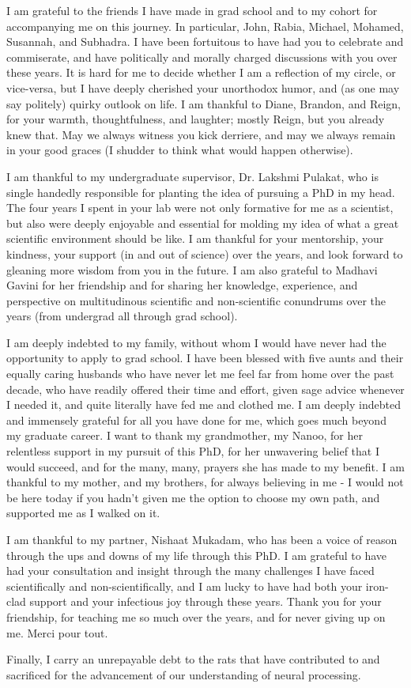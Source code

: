 \documentclass[openany,oneside]{brandeis-dissertation3.12}
\begin{document}
\begin{doublespace}
I am grateful to the friends I have made in grad school and to my cohort for accompanying me on this journey. In particular, John, Rabia, Michael, Mohamed, Susannah, and Subhadra. I have been fortuitous to have had you to celebrate and commiserate, and have politically and morally charged discussions with you over these years. It is hard for me to decide whether I am a reflection of my circle, or vice-versa, but I have deeply cherished your unorthodox humor, and (as one may say politely) quirky outlook on life. I am thankful to Diane, Brandon, and Reign, for your warmth, thoughtfulness, and laughter; mostly Reign, but you already knew that. May we always witness you kick derriere, and may we always remain in your good graces (I shudder to think what would happen otherwise).

I am thankful to my undergraduate supervisor, Dr. Lakshmi Pulakat, who is single handedly responsible for planting the idea of pursuing a PhD in my head. The four years I spent in your lab were not only formative for me as a scientist, but also were deeply enjoyable and essential for molding my idea of what a great scientific environment should be like. I am thankful for your mentorship, your kindness, your support (in and out of science) over the years, and look forward to gleaning more wisdom from you in the future. I am also grateful to Madhavi Gavini for her friendship and for sharing her knowledge, experience, and perspective on multitudinous scientific and non-scientific conundrums over the years (from undergrad all through grad school).

I am deeply indebted to my family, without whom I would have never had the opportunity to apply to grad school. I have been blessed with five aunts and their equally caring husbands who have never let me feel far from home over the past decade, who have readily offered their time and effort, given sage advice whenever I needed it, and quite literally have fed me and clothed me. I am deeply indebted and immensely grateful for all you have done for me, which goes much beyond my graduate career. I want to thank my grandmother, my Nanoo, for her relentless support in my pursuit of this PhD, for her unwavering belief that I would succeed, and for the many, many, prayers she has made to my benefit. I am thankful to my mother, and my brothers, for always believing in me - I would not be here today if you hadn’t given me the option to choose my own path, and supported me as I walked on it.

I am thankful to my partner, Nishaat Mukadam, who has been a voice of reason through the ups and downs of my life through this PhD. I am grateful to have had your consultation and insight through the many challenges I have faced scientifically and non-scientifically, and I am lucky to have had both your iron-clad support and your infectious joy through these years. Thank you for your friendship, for teaching me so much over the years, and for never giving up on me. Merci pour tout.

Finally, I carry an unrepayable debt to the rats that have contributed to and sacrificed for the advancement of our understanding of neural processing.
\end{doublespace}
\end{document}
